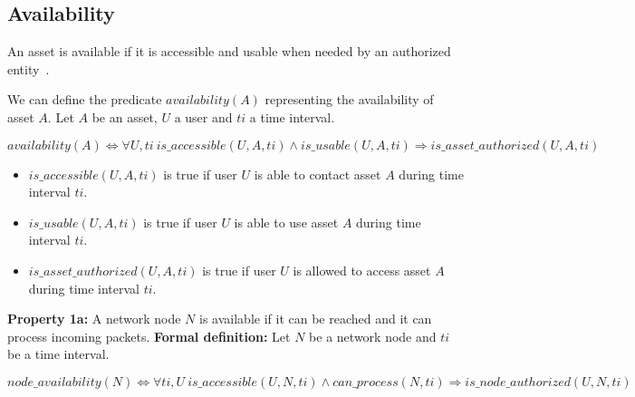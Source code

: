 \subsection{Availability}
\label{sec:prop-avail}
An asset is available if it is accessible and usable when
needed by an authorized entity~\cite{ISO/IEC270012013}.

We can define the predicate $availability(A)$ representing the availability of asset $A$.
\newline
Let $A$ be an asset, $U$ a user and $ti$ a time interval.
\newline

\begin{myformula}
$availability(A) \Leftrightarrow \forall U,ti~is\_accessible(U,A,ti) \wedge is\_usable(U,A,ti) \Rightarrow is\_asset\_authorized(U,A,ti)$
\end{myformula}

\begin{itemize}
\item $is\_accessible(U,A,ti)$ is true if user $U$ is able to contact asset $A$ during time interval $ti$.
\item $is\_usable(U,A,ti)$ is true if user $U$ is able to use asset $A$ during time interval $ti$.
\item $is\_asset\_authorized(U,A,ti)$ is true if user $U$ is allowed to access asset $A$  during time interval $ti$.
\end{itemize}

\textbf{Property 1a:} A network node $N$ is available if it can be reached and it can process incoming packets.
\newline
\textbf{Formal definition:} Let $N$ be a network node and $ti$ be a time interval.

\begin{myformula}
$node\_availability(N) \Leftrightarrow \forall ti,U~ is\_accessible(U,N,ti) \wedge can\_process(N,ti) \Rightarrow is\_node\_authorized(U,N,ti)$
\end{myformula}

